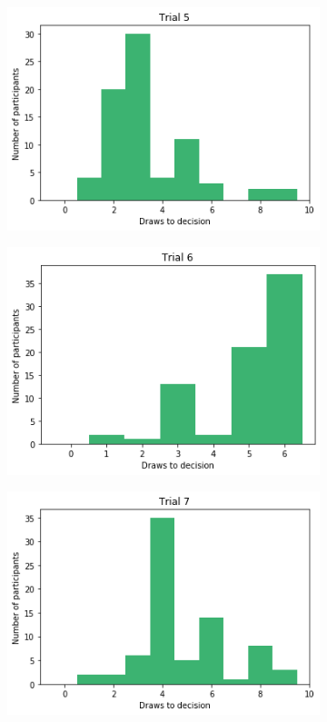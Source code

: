 \begin{figure}
    \centering
    \begin{subfigure}{0.48\textwidth}
        \includegraphics[scale=0.38]{pictures/dtd5_histogram.png}
    \end{subfigure}
    \hfill
    \begin{subfigure}{0.48\textwidth}
        \includegraphics[scale=0.38]{pictures/dtd6_histogram.png}
    \end{subfigure}
    \vfill
    \begin{subfigure}{0.48\textwidth}
        \includegraphics[scale=0.38]{pictures/dtd7_histogram.png}

\end{subfigure}
\end{figure}
